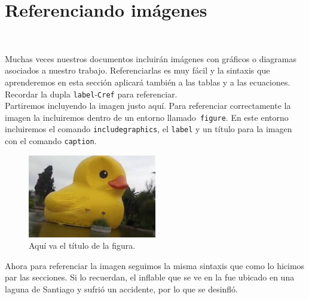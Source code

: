 \documentclass{article}
\begin{document}
\section{Referenciando imágenes} \label{sec:RefImagenes}

Muchas veces nuestros documentos incluirán imágenes con gráficos o diagramas asociados a nuestro trabajo. Referenciarlas es muy fácil y la sintaxis que aprenderemos en esta sección aplicará también a las tablas y a las ecuaciones. Recordar la dupla \texttt{label}-\texttt{Cref} para referenciar.\\

Partiremos incluyendo la imagen justo aquí. Para referenciar correctamente la imagen la incluiremos dentro de un entorno llamado \texttt{figure}. En este entorno incluiremos el comando \texttt{includegraphics}, el \texttt{label} y un título para la imagen con el comando \texttt{caption}.

\begin{figure}[H] %

	\centering

	\caption{Aquí va el título de la figura.}
	
	\label{fig:patito}
	
	\includegraphics[width=0.5\textwidth]{pobrepatito} %
\end{figure}

Ahora para referenciar la imagen seguimos la misma sintaxis que como lo hicimos par las secciones. Si lo recuerdan, el inflable que se ve en la  fue ubicado en una laguna de Santiago y sufrió un accidente, por lo que se desinfló.\\
\end{document}
